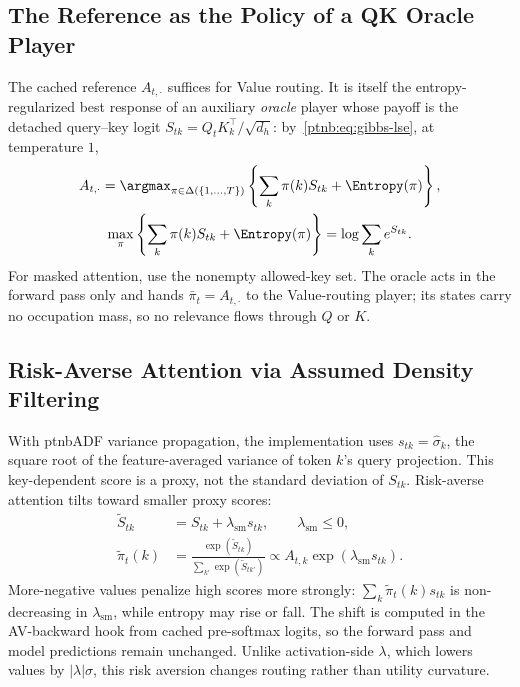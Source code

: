 \subsection{The Reference as the Policy of a QK Oracle Player}\label{ptnb:app:attention-oracle}

The cached reference $A_{t,\cdot}$ suffices for Value routing. It is itself the entropy-regularized best response of an auxiliary \emph{oracle} player whose payoff is the detached query--key logit $S_{tk}=Q_tK_k^\top/\sqrt{d_h}$: by~\eqref{ptnb:eq:gibbs-lse}, at temperature $1$,
\begin{equation}\label{ptnb:eq:attn-qk-oracle}
\begin{gathered}
    A_{t,\cdot}=\argmax_{\pi\in\Delta(\{1,\dots,T\})}
      \left\{\sum_k\pi(k)S_{tk}+\Entropy(\pi)\right\},\\
    \max_{\pi}\left\{\sum_k\pi(k)S_{tk}+\Entropy(\pi)\right\}
      =\log\sum_k e^{S_{tk}}.
\end{gathered}
\end{equation}
For masked attention, use the nonempty allowed-key set. The oracle acts in the forward pass only and hands $\bar\pi_t=A_{t,\cdot}$ to the Value-routing player; its states carry no occupation mass, so no relevance flows through $Q$ or $K$.

\subsection{Risk-Averse Attention via Assumed Density Filtering}\label{ptnb:app:risk-attn}

With \ac{ptnbADF} variance propagation, the implementation uses $s_{tk}=\hat\sigma_k$, the square root of the feature-averaged variance of token $k$'s query projection. This key-dependent score is a proxy, not the standard deviation of $S_{tk}$. Risk-averse attention tilts toward smaller proxy scores:
\begin{align}
    \tilde S_{tk}&=S_{tk}+\lambda_{\mathrm{sm}}s_{tk},
       \qquad\lambda_{\mathrm{sm}}\le0,\label{ptnb:eq:risk-attn-policy}\\
    \tilde\pi_t(k)&=\frac{\exp(\tilde S_{tk})}{\sum_{k'}\exp(\tilde S_{tk'})}
       \propto A_{t,k}\exp(\lambda_{\mathrm{sm}}s_{tk}).\label{ptnb:eq:risk-attn-policy-softmax}
\end{align}
More-negative values penalize high scores more strongly: $\sum_k\tilde\pi_t(k)s_{tk}$ is non-decreasing in $\lambda_{\mathrm{sm}}$, while entropy may rise or fall. The shift is computed in the AV-backward hook from cached pre-softmax logits, so the forward pass and model predictions remain unchanged. Unlike activation-side $\lambda$, which lowers values by $|\lambda|\sigma$, this risk aversion changes routing rather than utility curvature.

